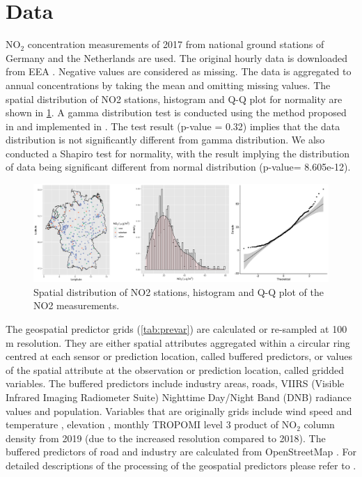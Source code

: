 \documentclass{article}
\begin{document}
\section{Data}
NO$_2$ concentration measurements of 2017 from national ground stations of Germany and the Netherlands are used. The original hourly data is downloaded from EEA \citep{EEA}. Negative values are considered as missing. The data is aggregated to annual concentrations by taking the mean and omitting missing values. The spatial distribution of NO2 stations, histogram and Q-Q plot for normality are shown in \cref{fig:histqq}. %
A gamma distribution test is conducted using the method proposed in \cite{villasenor2015variance} and implemented in \cite{goft}.  The test result (p-value = 0.32) implies that the data distribution is not significantly different from gamma distribution. We also conducted a Shapiro test for normality, with the result implying the distribution of data being significant different from normal distribution (p-value= 8.605e-12).

\begin{figure}
    \centering
    \includegraphics[scale=0.06]{fig/histqq_NO2.png}
    \caption{Spatial distribution of NO2 stations, histogram and Q-Q plot of the NO2 measurements.}
    \label{fig:histqq}
\end{figure}{}
The geospatial predictor grids (\cref{tab:prevar}) are calculated or re-sampled at 100 m resolution. They are either spatial attributes aggregated within a circular ring centred at each sensor or prediction location, called buffered predictors, or values of the spatial attribute at the observation or prediction location, called gridded variables. The buffered predictors include industry areas, roads, VIIRS (Visible Infrared Imaging Radiometer Suite) Nighttime Day/Night Band (DNB) radiance values \citep[nightlight,][]{nightlight} and population. Variables that are originally grids include wind speed and temperature \citep{dee2011era}, elevation \citep{amante2009etopo1}, monthly TROPOMI level 3 product of NO$_2$ column density  \citep{TROPOMIgee} from 2019 (due to the increased resolution compared to 2018). The buffered predictors of road and industry are calculated from OpenStreetMap  \citep{openstreetmap}. For detailed descriptions of the processing of the geospatial predictors please refer to \cite{luglobal}.   
\end{document}

